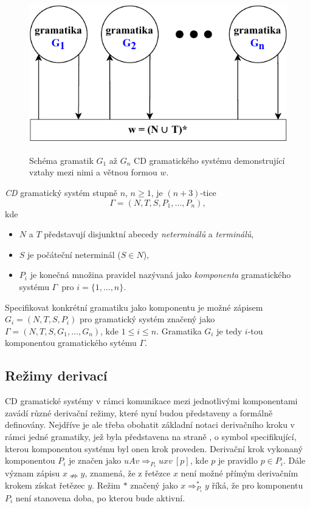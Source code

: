 \begin{figure}[h]\centering
  \centering
  \includegraphics[scale=0.85]{obrazky/GramatickySystemCD.pdf}\\[1pt]
  \caption{Schéma gramatik $G_1$ až $G_n$ CD gramatického systému demonstrující vztahy mezi nimi a větnou formou $w$.}
  \label{obrGramatickySystemCD}
\end{figure}

\begin{definice} \label{defCDgramatickySystem}
 \emph{CD} gramatický systém stupně $n$, $n \geq 1$, je $(n+3)$-tice
  $$\Gamma = (N, T, S, P_1, \dots, P_n),$$
  kde
  \begin{itemize}
    \item $N$ a $T$ představují disjunktní abecedy \emph{neterminálů} a \emph{terminálů},
    \item $S$ je počáteční neterminál ($S \in N$),
    \item $P_i$ je konečná množina pravidel nazývaná jako \emph{komponenta} gramatického systému $\Gamma$~pro $i = \{1, \dots, n\}$.
  \end{itemize}

  Specifikovat konkrétní gramatiku jako komponentu je možné zápisem $G_i = (N, T, S, P_i)$ pro gramatický systém značený jako $\Gamma = (N, T, S, G_1, \dots, G_n)$, kde $1 \leq i \leq n$.
  Gramatika $G_i$ je tedy $i$-tou komponentou gramatického sytému $\Gamma$.
\end{definice}

\subsection*{Režimy derivací}
CD gramatické systémy v rámci komunikace mezi jednotlivými komponentami zavádí různé derivační režimy, které nyní budou představeny a formálně definovány.
Nejdříve je ale třeba obohatit základní notaci derivačního kroku v rámci jedné gramatiky, jež byla představena na straně \pageref{NadpisDerivacniKrok}, o symbol specifikující, kterou komponentou systému byl
onen krok proveden. Derivační krok vykonaný komponentou $P_i$ je značen jako $uAv \Rightarrow_{P_i} uxv\ [p]$, kde $p$ je pravidlo $p \in P_i$. Dále význam zápisu $x \nRightarrow y$, znamená, že
z řetězce $x$ není možné přímým derivačním krokem získat řetězec $y$. Režim $*$ značený jako $x \Rightarrow_{P_i}^{*} y$ říká, že pro komponentu $P_i$ není stanovena doba, po kterou bude aktivní.

